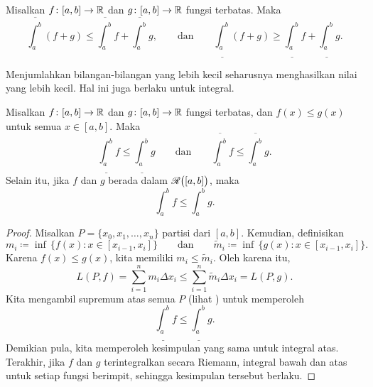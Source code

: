 \begin{prop} \label{prop:upperlowerlinineq}
Misalkan $f \colon [a,b] \to {\mathbb{R}}$ dan $g \colon [a,b] \to {\mathbb{R}}$ fungsi
terbatas.  Maka
\begin{equation*}
\overline{\int_a^b} (f+g) \leq \overline{\int_a^b}f+\overline{\int_a^b}g
,
\qquad
\text{dan}
\qquad
\underline{\int_a^b} (f+g) \geq \underline{\int_a^b}f+\underline{\int_a^b}g
.
\end{equation*}
\end{prop}

Menjumlahkan bilangan-bilangan yang lebih kecil seharusnya menghasilkan nilai yang lebih kecil.
Hal ini juga berlaku untuk integral.

\begin{prop}[Kemonotonan]
Misalkan $f \colon [a,b] \to {\mathbb{R}}$ dan $g \colon [a,b] \to {\mathbb{R}}$ fungsi
terbatas, dan $f(x) \leq g(x)$
untuk semua $x \in [a,b]$.  Maka
\begin{equation*}
\underline{\int_a^b} f 
\leq
\underline{\int_a^b} g 
\qquad \text{dan} \qquad
\overline{\int_a^b} f 
\leq
\overline{\int_a^b} g .
\end{equation*}
Selain itu, jika $f$ dan $g$ berada dalam ${\mathscr{R}}\bigl([a,b]\bigr)$, maka
\begin{equation*}
\int_a^b f 
\leq
\int_a^b g .
\end{equation*}
\end{prop}

\begin{proof}
Misalkan $P = \{ x_0, x_1, \ldots, x_n \}$ partisi dari $[a,b]$.  Kemudian,
definisikan
\begin{equation*}
m_i \coloneqq \inf \, \bigl\{ f(x) : x \in [x_{i-1},x_i] \bigr\}
\qquad \text{dan} \qquad
\widetilde{m}_i \coloneqq \inf \, \bigl\{ g(x) : x \in [x_{i-1},x_i] \bigr\} .
\end{equation*}
Karena $f(x) \leq g(x)$, kita memiliki $m_i \leq \widetilde{m}_i$.
Oleh karena itu,
\begin{equation*}
L(P,f)
=
\sum_{i=1}^n m_i \Delta x_i
\leq
\sum_{i=1}^n \widetilde{m}_i \Delta x_i
=
L(P,g) .
\end{equation*}
Kita mengambil supremum atas semua $P$ (lihat ) untuk memperoleh
\begin{equation*}
\underline{\int_a^b} f 
\leq
\underline{\int_a^b} g .
\end{equation*}
Demikian pula, kita memperoleh kesimpulan yang sama untuk integral atas.
Terakhir, jika $f$ dan $g$ terintegralkan secara Riemann, integral bawah dan atas
untuk setiap fungsi berimpit, sehingga kesimpulan tersebut berlaku.
\end{proof}

